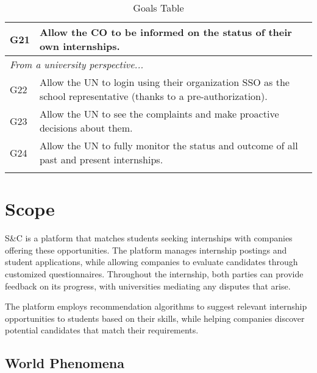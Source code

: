 \begin{longtable}{|l|p{}|}
    \hline
    G21           & Allow the CO to be informed on the status of their own internships.                                                                               \\
    \hline \hline
    \multicolumn{2}{|l|}{\textit{From a university perspective...}}                                                                                                   \\
    \hline
    G22           & Allow the UN to login using their organization SSO as the school representative (thanks to a pre-authorization).                                  \\
    \hline
    G23           & Allow the UN to see the complaints and make proactive decisions about them.                                                                       \\
    \hline
    G24           & Allow the UN to fully monitor the status and outcome of all past and present internships.                                                         \\
    \hline
    \caption{Goals Table}
    \label{tab:goals}
\end{longtable}

\section{Scope}
\label{sec:scope}%

\par S\&C is a platform that matches students seeking internships with companies offering these opportunities. The
platform manages internship postings and student applications, while allowing companies to evaluate candidates through
customized questionnaires. Throughout the internship, both parties can provide feedback on its progress, with
universities mediating any disputes that arise.

\par The platform employs recommendation algorithms to suggest relevant internship opportunities to students based on
their skills, while helping companies discover potential candidates that match their requirements.

\subsection{World Phenomena}
\label{subsec:world-phenomena}%

